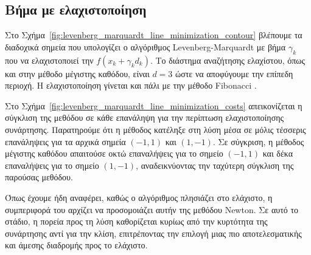 \documentclass[a4paper,12pt]{article}
\begin{document}
\subsection*{Βήμα με ελαχιστοποίηση}
Στο Σχήμα~\ref{fig:levenberg_marquardt_line_minimization_contour} βλέπουμε τα διαδοχικά σημεία που υπολογίζει
ο αλγόριθμος  Levenberg-Marquardt  με βήμα $\gamma_k$ που να
ελαχιστοποιεί την $f(x_k + \gamma_k d_k)$. Το διάστημα αναζήτησης ελαχίστου, όπως και στην μέθοδο μέγιστης καθόδου,
είναι $d=3$ ώστε να αποφύγουμε την επίπεδη περιοχή. Η ελαχιστοποίηση γίνεται και πάλι με την μέθοδο
 Fibonacci .

Στο Σχήμα~\ref{fig:levenberg_marquardt_line_minimization_costs} απεικονίζεται η σύγκλιση της μεθόδου σε κάθε επανάληψη 
για την περίπτωση ελαχιστοποίησης συνάρτησης. Παρατηρούμε ότι η μέθοδος κατέληξε στη λύση μέσα σε μόλις τέσσερις 
επανάληψεις για τα αρχικά σημεία $(-1, 1)$ και $(1, -1)$. Σε σύγκριση, η μέθοδος μέγιστης καθόδου απαιτούσε οκτώ 
επαναλήψεις για το σημείο $(-1, 1)$ και δέκα επαναλήψεις για το σημείο $(1, -1)$, αναδεικνύοντας την ταχύτερη 
σύγκλιση της παρούσας μεθόδου.

Όπως έχουμε ήδη αναφέρει, καθώς ο αλγόριθμος πλησιάζει στο ελάχιστο, η συμπεριφορά του αρχίζει να προσομοιάζει αυτήν της
μεθόδου Newton. Σε αυτό το στάδιο, η πορεία προς τη λύση καθορίζεται
κυρίως από την κυρτότητα της συνάρτησης αντί για την κλίση, επιτρέποντας την επιλογή μιας πιο αποτελεσματικής και άμεσης
διαδρομής προς το ελάχιστο.
\end{document}
